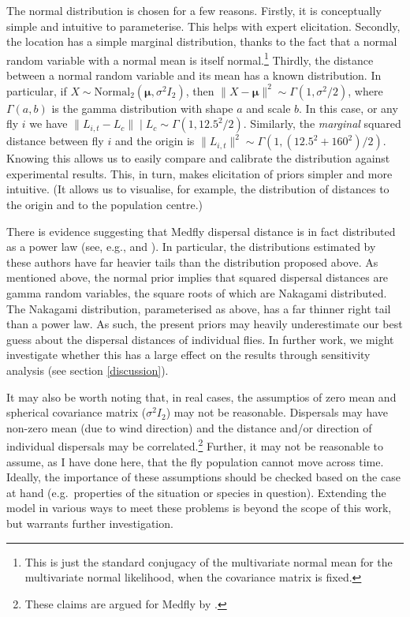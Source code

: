 \documentclass[
  oneside]{book}
\begin{document}
The normal distribution is chosen for a few reasons. Firstly, it is conceptually simple and intuitive to parameterise. This helps with expert elicitation. Secondly, the location has a simple marginal distribution, thanks to the fact that a normal random variable with a normal mean is itself normal.\footnote{This is just the standard conjugacy of the multivariate normal mean for the multivariate normal likelihood, when the covariance matrix is fixed.} Thirdly, the distance between a normal random variable and its mean has a known distribution. In particular, if \(X \sim \mathrm{Normal}_2(\pmb \mu, \sigma^2 I_2)\), then \(\lVert X - \pmb \mu \rVert^2 \sim \Gamma(1, \sigma^2/2)\), where \(\Gamma(a, b)\) is the gamma distribution with shape \(a\) and scale \(b\). In this case, or any fly \(i\) we have \(\lVert L_{i,t} - L_c \rVert \mid L_c \sim \Gamma(1, 12.5^2/2)\). Similarly, the \emph{marginal} squared distance between fly \(i\) and the origin is \(\lVert L_{i, t} \rVert^2 \sim \Gamma(1, (12.5^2 + 160^2) / 2)\). Knowing this allows us to easily compare and calibrate the distribution against experimental results. This, in turn, makes elicitation of priors simpler and more intuitive. (It allows us to visualise, for example, the distribution of distances to the origin and to the population centre.)

There is evidence suggesting that Medfly dispersal distance is in fact distributed as a power law (see, e.g., \citet{meats2005} and \citet{plant1991}). In particular, the distributions estimated by these authors have far heavier tails than the distribution proposed above. As mentioned above, the normal prior implies that squared dispersal distances are gamma random variables, the square roots of which are Nakagami distributed. The Nakagami distribution, parameterised as above, has a far thinner right tail than a power law. As such, the present priors may heavily underestimate our best guess about the dispersal distances of individual flies. In further work, we might investigate whether this has a large effect on the results through sensitivity analysis (see section \ref{discussion}).

It may also be worth noting that, in real cases, the assumptios of zero mean and spherical covariance matrix (\(\sigma^2 I_2\)) may not be reasonable. Dispersals may have non-zero mean (due to wind direction) and the distance and/or direction of individual dispersals may be correlated.\footnote{These claims are argued for Medfly by \citet{baker1986}.} Further, it may not be reasonable to assume, as I have done here, that the fly population cannot move across time. Ideally, the importance of these assumptions should be checked based on the case at hand (e.g.~properties of the situation or species in question). Extending the model in various ways to meet these problems is beyond the scope of this work, but warrants further investigation.
\end{document}
